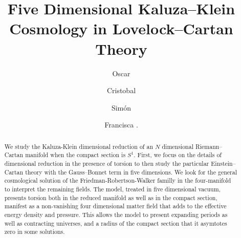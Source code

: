 \documentclass[aps,prd,12pt,superscriptaddress,showpacs,showkeys,longbibliography,reprint]{revtex4-1}
\begin{document}
\title{Five Dimensional Kaluza--Klein Cosmology in Lovelock--Cartan Theory}

\author{Oscar }

\author{Cristobal }

\author{Sim\'on }

\author{Francisca .}

\begin{abstract}
 We study the Kaluza-Klein dimensional reduction of an $N$ dimensional Riemann--Cartan manifold when the compact section is $S^1$. First, we focus on the details of dimensional reduction in the presence of torsion to then study the particular Einstein--Cartan theory with the Gauss--Bonnet term in five dimensions. We look for the general cosmological solution of the Friedman-Robertson-Walker familly in the four-manifold to interpret the remaining fields. The model, treated in five dimensional vacuum, presents torsion both in the reduced manifold as well as in the compact section, manifest as a non-vanishing four dimensional matter field that adds to the effective energy density and pressure. This allows the model to present expanding periods as well as contracting universes, and a radius of the compact section that it asymtotes zero in some solutions. 
\end{abstract}



\maketitle
\end{document}
